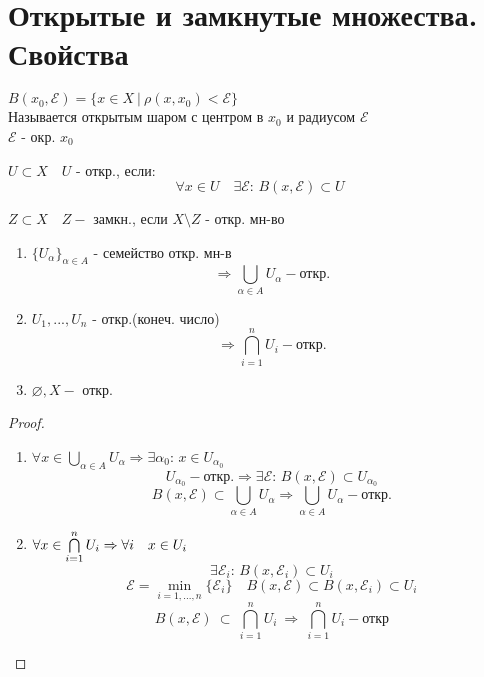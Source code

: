 \documentclass[geometry.tex]{subfiles}
\begin{document}
  \section{Открытые и замкнутые множества. Свойства}

  \begin{definition}
      $B(x_0, \mathcal{E}) = \{x \in X \ | \ \rho(x, x_0) < \mathcal{E}\}$\\
      Называется открытым шаром с центром в $x_0$ и радиусом $\mathcal{E}$\\
      $\mathcal{E}$ - окр.  $x_0$
  \end{definition}

  \begin{definition}
      $U \subset X \quad U$ - откр., если:
      \[\forall x \in U \quad \exists \mathcal{E}\text{: } B(x, \mathcal{E}) \subset U\]
  \end{definition}

  \begin{definition}
      $Z \subset X \quad Z -$ замкн., если $X \setminus Z$ - откр. мн-во
  \end{definition}

  \begin{theorem}[св-ва откр. мн-в]
      \begin{enumerate}
          \item $\{ U_\alpha \}_{\alpha \in A}$ - семейство откр. мн-в
                 \[\Rightarrow \bigcup_{\alpha \in A}U_\alpha - \text{откр.}\]
          \item $U_1,...,U_n$ - откр.(конеч. число) \[\Rightarrow \bigcap_{i = 1}^n U_i - \text{откр.}\]
          \item $\varnothing, X - $ откр.
      \end{enumerate}
  \end{theorem}
  \begin{proof}
      \begin{enumerate}
          \item $\forall x \in \bigcup\limits_{\alpha \in A} U_\alpha \Rightarrow \exists \alpha_0\text{: } x \in U_{\alpha_0}$
                 \[U_{\alpha_0} - \text{откр.}\Rightarrow \exists \mathcal{E}\text{: } B(x, \mathcal{E}) \subset U_{\alpha_0}\]
                 \[B(x, \mathcal{E}) \subset \bigcup_{\alpha \in A} U_\alpha \Rightarrow
                 \bigcup_{\alpha \in A} U_\alpha - \text{откр.}\]
          \item $\forall x \in \bigcap\limits_{i = 1}^n U_i \Rightarrow \forall i \quad x \in U_i$
                \[\exists \mathcal{E}_i\text{: } B(x, \mathcal{E}_i) \subset U_i\]
                \[\mathcal{E} = \min_{i = 1,..., n}\{\mathcal{E}_i\} \quad B(x, \mathcal{E}) \subset B(x, \mathcal{E}_i) \subset U_i\]
                \[B(x, \mathcal{E}) \ \subset\  \bigcap\limits_{i=1}^n U_i\  \Rightarrow\  \bigcap\limits_{i = 1} ^ n U_i - \text{откр}\]
      \end{enumerate}
  \end{proof}
\end{document}
